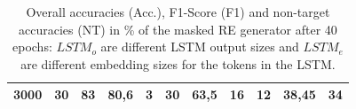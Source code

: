 \begin{table}[ht]
\begin{tabular}{cc|ccc|ccc|ccc}
        {3000}   & {30}     & {83}                                & {80,6}                              & {3}                                      & {30}          & {63,5}         & {16}        & {12}          & {38,45}        & {34}        \\
        \bottomrule
    \end{tabular}
    \caption{Overall accuracies (Acc.), F1-Score (F1) and non-target accuracies (NT) in \% of the masked RE generator after 40 epochs: $LSTM_o$ are different LSTM output sizes and $LSTM_e$ are different embedding sizes for the tokens in the LSTM.}
    \label{tab:results:masked-re-generator}
\end{table}

